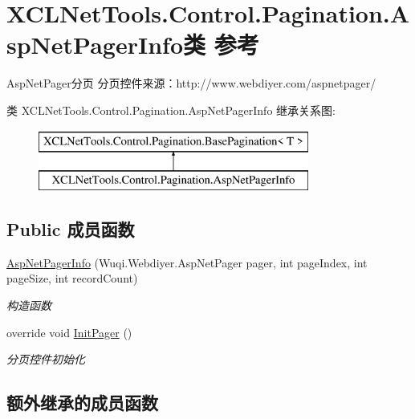 \hypertarget{class_x_c_l_net_tools_1_1_control_1_1_pagination_1_1_asp_net_pager_info}{\section{X\-C\-L\-Net\-Tools.\-Control.\-Pagination.\-Asp\-Net\-Pager\-Info类 参考}
\label{class_x_c_l_net_tools_1_1_control_1_1_pagination_1_1_asp_net_pager_info}
}


Asp\-Net\-Pager分页 分页控件来源：http\-://www.webdiyer.\-com/aspnetpager/  


类 X\-C\-L\-Net\-Tools.\-Control.\-Pagination.\-Asp\-Net\-Pager\-Info 继承关系图\-:\begin{figure}[H]
\begin{center}
\leavevmode
\includegraphics[height=2.000000cm]{class_x_c_l_net_tools_1_1_control_1_1_pagination_1_1_asp_net_pager_info}
\end{center}
\end{figure}
\subsection*{Public 成员函数}
\begin{DoxyCompactItemize}
\item 
\hyperlink{class_x_c_l_net_tools_1_1_control_1_1_pagination_1_1_asp_net_pager_info_aef75d024dd66cc9d75cd61d4dddcb27b}{Asp\-Net\-Pager\-Info} (Wuqi.\-Webdiyer.\-Asp\-Net\-Pager pager, int page\-Index, int page\-Size, int record\-Count)
\begin{DoxyCompactList}\small\item\em 构造函数 \end{DoxyCompactList}\item 
override void \hyperlink{class_x_c_l_net_tools_1_1_control_1_1_pagination_1_1_asp_net_pager_info_a46b208799b1d020c45571657c707ddf0}{Init\-Pager} ()
\begin{DoxyCompactList}\small\item\em 分页控件初始化 \end{DoxyCompactList}\end{DoxyCompactItemize}
\subsection*{额外继承的成员函数}


